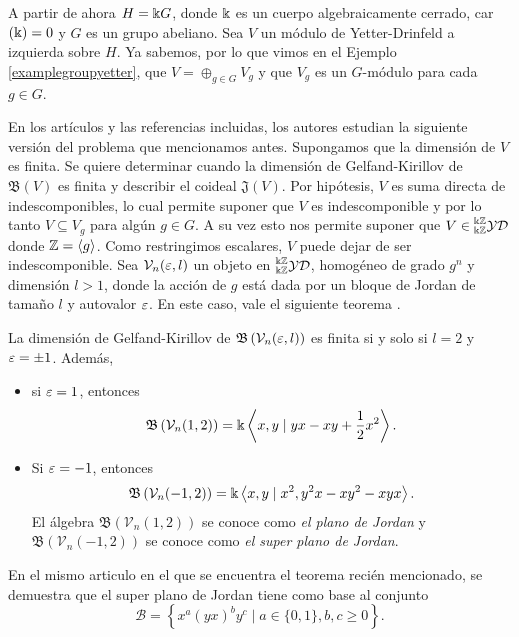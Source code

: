 \documentclass[a4paper,oneside,fleqn,11pt,../tesis.tex]{subfiles}
\begin{document}
A partir de ahora $H = \Bbbk G$, donde $\Bbbk$ es un cuerpo algebraicamente cerrado, car$(\Bbbk) = 0$ y
$G$ es un grupo abeliano. Sea $V$ un módulo de Yetter-Drinfeld a izquierda sobre $H$. Ya sabemos, por lo que vimos en el Ejemplo \ref{examplegroupyetter}, que $V = \oplus_{g \in G} V_g$ y que $V_g$ es un $G$-módulo para cada $g \in G$.

En los artículos \cite{AAH2} y las referencias incluidas, los autores estudian la siguiente versión del problema que mencionamos antes. Supongamos que la dimensión de $V$ es finita. Se quiere determinar cuando
la dimensión de Gelfand-Kirillov de $\mathfrak{B}(V)$ es finita y describir el coideal $\mathfrak{J}(V)$.
Por hipótesis, $V$ es suma directa de indescomponibles, lo cual permite suponer
que $V$ es indescomponible y por lo tanto $V \subseteq V_g$ para algún $g \in G$. A su vez esto nos permite suponer
que $V \in \prescript{\Bbbk\mathbb{Z}}{\Bbbk\mathbb{Z}}{\mathcal{YD}}$ donde $\mathbb{Z} = \left\langle g \right\rangle$. Como restringimos escalares, $V$ puede dejar de ser indescomponible. Sea $\mathcal{V}_n(\varepsilon, l)$ un objeto en $\prescript{\Bbbk\mathbb{Z}}{\Bbbk\mathbb{Z}}{\mathcal{YD}}$, homogéneo de grado $g^n$ y dimensión $l > 1$, 
donde la acción de $g$ está dada por un bloque de Jordan de tamaño $l$ y autovalor $\varepsilon$.
En este caso, vale el siguiente teorema \cite{AAH}.

\begin{Teorema}
La dimensión de Gelfand-Kirillov de $\mathfrak{B}\left(\mathcal{V}_n(\varepsilon, l)\right)$ es finita si y solo si $l = 2$ y $\varepsilon = \pm 1$.
Además,
\begin{itemize}
	\item si $\varepsilon = 1$, entonces
	\[
		\mathfrak{B}\left(\mathcal{V}_n(1, 2)\right) = \Bbbk\left\langle x, y \mid yx - xy + \frac{1}{2}x^2 \right\rangle.
	\]
	\item Si $\varepsilon = -1$, entonces
	\[
		\mathfrak{B}\left(\mathcal{V}_n(-1, 2)\right) = \Bbbk\left\langle x, y \mid x^2, y^2x - xy^2 - xyx \right\rangle.
	\]
	El álgebra $\mathfrak{B}\left(\mathcal{V}_n(1, 2)\right)$ se conoce como \emph{el plano de Jordan}
	y $\mathfrak{B}\left(\mathcal{V}_n(-1, 2)\right)$ se conoce como \emph{el super plano de Jordan}.
\end{itemize}
\end{Teorema}
En el mismo articulo en el que se encuentra el teorema recién mencionado, se demuestra que el super plano de Jordan tiene como base al conjunto
\[
	\mathcal{B} = \left\lbrace x^{a}(yx)^{b}y^c \mid a \in \lbrace 0, 1 \rbrace, b, c \geq 0\right\rbrace.
\]
\end{document}
